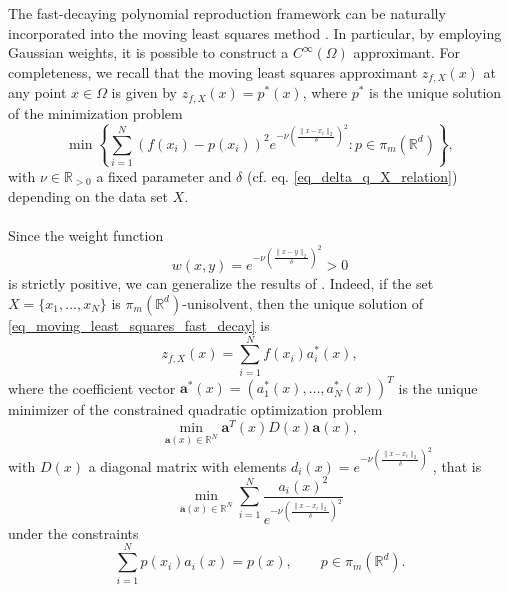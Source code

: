 \documentclass{drna}
\begin{document}
The fast-decaying polynomial reproduction framework can be naturally incorporated into the moving least squares method \cite{lancaster_1981,mclain_1974,mclain_1976,shepard_1968}. In particular, by employing Gaussian weights, it is possible to construct a $ C^\infty(\Omega)$ approximant. For completeness, we recall that the moving least squares approximant $z_{f,X}(x)$ at any point $x \in \Omega$ is given by $z_{f,X}(x) = p^*(x)$, where $p^{*}$ is the unique solution of the minimization problem
\begin{equation}
	\min \left\{ \sum_{i=1}^{N}(f(x_i)-p(x_i))^2e^{-\nu \left(\frac{\|x-x_i\|_2}{\delta}\right)^2} : p \in \pi_{m}(\mathbb{R}^d)\right\},
 \label{eq_moving_least_squares_fast_decay}
\end{equation}
with $\nu \in \mathbb{R}_{>0}$ a fixed parameter and $\delta$ (cf. eq. \eqref{eq_delta_q_X_relation}) depending on the data set $X$.
\\
\\
Since the weight function 
\begin{equation*}
    w(x,y) = e^{-\nu \left(\frac{\|x-y\|_2}{\delta}\right)^2}>0
\end{equation*} is strictly positive, we can generalize the results of \cite[Section 4.1]{wendland_2004}. Indeed, if the set $X=\{x_1,\dots,x_N \}$ is $\pi_{m}(\mathbb{R}^d)$-unisolvent, then the unique solution of \eqref{eq_moving_least_squares_fast_decay} is
\begin{equation*}
	z_{f,X}(x) = \sum_{i=1}^{N} f(x_i)a_i^{*}(x),
\end{equation*}
where the coefficient vector $\boldsymbol{a}^*(x) = (a_1^*(x), \dots, a_N^*(x))^T$ is the unique minimizer of the constrained quadratic optimization problem
\begin{equation*}
\min_{\boldsymbol{a}(x) \in \mathbb{R}^N} \boldsymbol{a}^T(x)D(x) \boldsymbol{a}(x),
\end{equation*}
with $D(x)$ a diagonal matrix with elements $d_i(x)=e^{-\nu \left(\frac{\|x-x_i\|_2}{\delta}\right)^2}$, that is  
\begin{equation}
	\min_{\boldsymbol{a}(x) \in \mathbb{R}^N} \sum_{i=1}^N \frac{a_{i}(x)^2}{e^{-\nu \left(\frac{\|x-x_i\|_2}{\delta}\right)^2}}
	\label{eq_def_minimization_mls_2_exp_fast_decay}
\end{equation}
under the constraints 
\begin{equation}
	\sum_{i=1}^N p(x_i)a_{i}(x) = p(x), \qquad p \in \pi_{m}(\mathbb{R}^d).
	\label{eq_def_minimization_mls_2_const_exp_fast_decay}
\end{equation}
\end{document}

